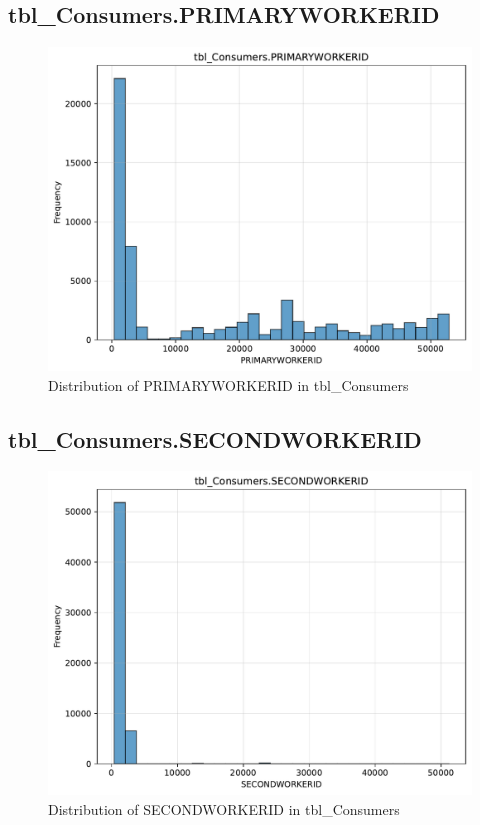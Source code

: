 \subsection{tbl\_Consumers.PRIMARYWORKERID}

\begin{figure}[htbp]
\centering
\includegraphics[width=\textwidth]{figures/dbo_tbl_Consumers_PRIMARYWORKERID.pdf}
\caption{Distribution of PRIMARYWORKERID in tbl\_Consumers}
\end{figure}\newpage

\subsection{tbl\_Consumers.SECONDWORKERID}

\begin{figure}[htbp]
\centering
\includegraphics[width=\textwidth]{figures/dbo_tbl_Consumers_SECONDWORKERID.pdf}
\caption{Distribution of SECONDWORKERID in tbl\_Consumers}
\end{figure}\newpage

